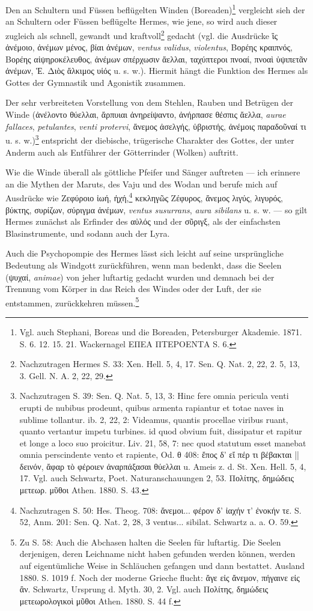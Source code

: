 \documentclass[a4paper, 11pt, oneside]{article}
\begin{document}
Den an Schultern und Füssen beflügelten Winden (Boreaden)\footnote{Vgl. auch Stephani, Boreas und die Boreaden, Petersburger Akademie. 1871. S. 6. 12. 15. 21. Wackernagel ΕΠΕΑ ΠΤΕΡΟΕΝΤΑ S. 6.} vergleicht sieh der an Schultern oder Füssen beflügelte Hermes, wie jene, so wird auch dieser zugleich als schnell, gewandt und kraftvoll\footnote{Nachzutragen Hermes S. 33: Xen. Hell. 5, 4, 17. Sen. Q. Nat. 2, 22, 2. 5, 13, 3. Gell. N. A. 2, 22, 29.} gedacht (vgl. die Ausdrücke ἲς ἀνέμοιο, ἀνέμων μένος, βίαι ἀνέμων, \emph{ventus validus}, \emph{violentus}, Βορέης κραιπνός, Βορέης αἰψηροκέλευθος, ἀνέμων σπέρχωσιν ἄελλαι, ταχύπτεροι πνοαί, πνοαὶ ὑψιπετᾶν ἀνέμων, Ἑ. Διὸς ἄλκιμος υἱός u. s. w.). Hiermit hängt die Funktion des Hermes als Gottes der Gymnastik und Agonistik zusammen.

Der sehr verbreiteten Vorstellung von dem Stehlen, Rauben und Betrügen der Winde (ἀνέλοντο θύελλαι, ἄρπυιαι ἀνηρείψαντο, ἀνήρπασε θέσπις ἄελλα, \emph{aurae fallaces}, \emph{petulantes}, \emph{venti protervi}, ἄνεμος ἀσελγής, ὑβριστής, ἀνέμοις παραδοῦναί τι u. s. w.)\footnote{Nachzutragen S. 39: Sen. Q. Nat. 5, 13, 3: Hinc fere omnia pericula venti erupti de nubibus prodeunt, quibus armenta rapiantur et totae naves in sublime tollantur. ib. 2, 22, 2: Videamus, quantis procellae viribus ruant, quanto vertantur impetu turbines. id quod obvium fuit, dissipatur et rapitur et longe a loco suo proicitur. Liv. 21, 58, 7: nec quod statutum esset manebat omnia perscindente vento et rapiente, Od. θ 408: ἔπος δ' εἴ πέρ τι βέβακται || δεινόν, ἄφαρ τὸ φέροιεν ἀναρπάξασαι θύελλαι u. Ameis z. d. St. Xen. Hell. 5, 4, 17. Vgl. auch Schwartz, Poet. Naturanschauungen 2, 53. Πολίτης, δημώδεις μετεωρ. μῦθοι Athen. 1880. S. 43.} entspricht der diebische, trügerische Charakter des Gottes, der unter Anderm auch als Entführer der Götterrinder (Wolken) auftritt.

Wie die Winde überall als göttliche Pfeifer und Sänger auftreten --- ich erinnere an die Mythen der Maruts, des Vaju und des Wodan und berufe mich auf Ausdrücke wie Ζεφύροιο ἰωή, ἠχή,\footnote{Nachzutragen S. 50: Hes. Theog. 708: ἄνεμοι... φέρον δ' ἰαχήν τ' ἐνοκήν τε. S. 52, Anm. 201: Sen. Q. Nat. 2, 28, 3 ventus... sibilat. Schwartz a. a. O. 59.} κεκληγῶς Ζέφυρος, ἄνεμος λιγύς, λιγυρός, βύκτης, συρίζων, σύριγμα ἀνέμων, \emph{ventus susurrans}, \emph{aura sibilans} u. s. w. --- so gilt Hermes zunächst als Erfinder des αὐλός und der σῦριγξ, als der einfachsten Blasinstrumente, und sodann auch der Lyra.

Auch die Psychopompie des Hermes lässt sich leicht auf seine ursprüngliche Bedeutung als Windgott zurückführen, wenn man bedenkt, dass die Seelen (ψυχαί, \emph{animae}) von jeher luftartig gedacht wurden und demnach bei der Trennung vom Körper in das Reich des Windes oder der Luft, der sie entstammen, zurückkehren müssen.\footnote{Zu S. 58: Auch die Abchasen halten die Seelen für luftartig. Die Seelen derjenigen, deren Leichname nicht haben gefunden werden können, werden auf eigentümliche Weise in Schläuchen gefangen und dann bestattet. Ausland 1880. S. 1019 f. Noch der moderne Grieche flucht: ἄγε εἰς ἄνεμον, πήγαινε εἰς ἂν. Schwartz, Ursprung d. Myth. 30, 2. Vgl. auch Πολίτης, δημώδεις μετεωρολογικοὶ μῦθοι Athen. 1880. S. 44 f.}
\end{document}
